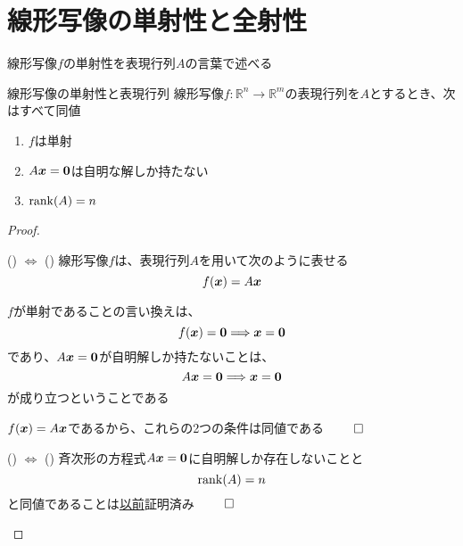 \documentclass[../../../topic_linear-algebra]{subfiles}
\begin{document}
\sectionline
\section{線形写像の単射性と全射性}

線形写像$f$の単射性を表現行列$A$の言葉で述べる

\begin{theorem}{線形写像の単射性と表現行列}
  線形写像$f\colon \mathbb{R}^n \to \mathbb{R}^m$の表現行列を$A$とするとき、次はすべて同値
  \begin{enumerate}[label=\romanlabel]
    \item $f$は単射
    \item $A\vb*{x} = \vb*{0}$は自明な解しか持たない
    \item $\rank(A) = n$
  \end{enumerate}
\end{theorem}

\begin{proof}
  \begin{subpattern}{() $\Longleftrightarrow$ ()}
    線形写像$f$は、表現行列$A$を用いて次のように表せる
    \begin{equation*}
      f(\vb*{x}) = A\vb*{x}
    \end{equation*}

    $f$が単射であることの言い換えは、
    \begin{equation*}
      f(\vb*{x}) = \vb*{0} \Longrightarrow \vb*{x} = \vb*{0}
    \end{equation*}
    であり、$A\vb*{x} = \vb*{0}$が自明解しか持たないことは、
    \begin{equation*}
      A\vb*{x} = \vb*{0} \Longrightarrow \vb*{x} = \vb*{0}
    \end{equation*}
    が成り立つということである

    $f(\vb*{x}) = A\vb*{x}$であるから、これらの2つの条件は同値である $\qed$
  \end{subpattern}

  \begin{subpattern}{() $\Longleftrightarrow$ ()}
    斉次形の方程式$A\vb*{x} = \vb*{0}$に自明解しか存在しないことと
    \begin{equation*}
      \rank(A) = n
    \end{equation*}
    と同値であることは\hyperref[thm:homogeneous-trivial-iff-full-col-rank]{以前}証明済み $\qed$
  \end{subpattern}
\end{proof}
\end{document}
